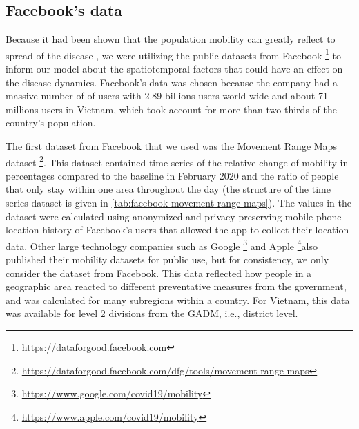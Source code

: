 \subsection{Facebook's data}
\label{sec:methodologies-data-mobility-data}

Because it had been shown that the population mobility can greatly reflect to spread of the disease \cite{changMobilityNetworkModels2021,liSubstantialUndocumentedInfection2020,ihmecovid-19forecastingteamModelingCOVID19Scenarios2021}, we were utilizing the public datasets from Facebook \footnote{\url{https://dataforgood.facebook.com}} to inform our model about the spatiotemporal factors that could have an effect on the disease dynamics.
Facebook's data was chosen because the company had a massive number of of users with 2.89 billions users world-wide and about 71 millions users in Vietnam, which took account for more than two thirds of the country's population.

The first dataset from Facebook that we used was the Movement Range Maps dataset \footnote{\url{https://dataforgood.facebook.com/dfg/tools/movement-range-maps}}.
This dataset contained time series of the relative change of mobility in percentages compared to the baseline in February 2020 and the ratio of people that only stay within one area throughout the day \cite{ProtectingPrivacyFacebook2020} (the structure of the time series dataset is given in \autoref{tab:facebook-movement-range-maps}).
The values in the dataset were calculated using anonymized and privacy-preserving mobile phone location history of Facebook's users that allowed the app to collect their location data.
Other large technology companies such as Google \footnote{\url{https://www.google.com/covid19/mobility}} and Apple \footnote{\url{https://www.apple.com/covid19/mobility} }also published their mobility datasets for public use, but for consistency, we only consider the dataset from Facebook.
This data reflected how people in a geographic area reacted to different preventative measures from the government, and was calculated for many subregions within a country.
For Vietnam, this data was available for level 2 divisions from the \gls{GADM}, i.e., district level.

